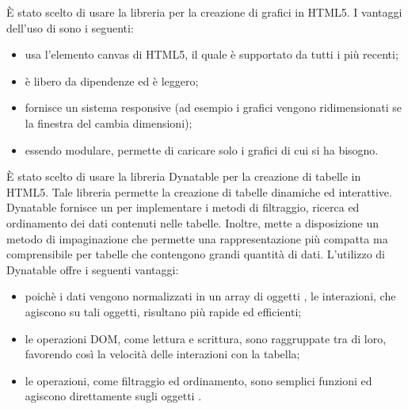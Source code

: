 È stato scelto di usare la libreria   per la creazione di grafici in HTML5.
I vantaggi dell'uso di  sono i seguenti:
\begin{itemize}
\item usa l'elemento canvas di HTML5, il quale è supportato da tutti i  più recenti;
\item è libero da dipendenze ed è leggero;
\item fornisce un sistema responsive (ad esempio i grafici vengono ridimensionati se la finestra del  cambia dimensioni);
\item essendo modulare, permette di caricare solo i grafici di cui si ha bisogno.
\end{itemize}

È stato scelto di usare la libreria  Dynatable per la creazione di tabelle in HTML5. Tale libreria permette la creazione di tabelle dinamiche ed interattive. Dynatable fornisce un  per implementare i metodi di filtraggio, ricerca ed ordinamento dei dati contenuti nelle tabelle. Inoltre, mette a disposizione un metodo di impaginazione che permette una rappresentazione più compatta ma comprensibile per tabelle che contengono grandi quantità di dati.
L'utilizzo di Dynatable offre i seguenti vantaggi:
\begin{itemize}
\item poichè i dati vengono normalizzati in un array di oggetti , le interazioni, che agiscono su tali oggetti, risultano più rapide ed efficienti;
\item le operazioni DOM, come lettura e scrittura, sono raggruppate tra di loro, favorendo così la velocità delle interazioni con la tabella;
\item le operazioni, come filtraggio ed ordinamento, sono semplici funzioni  ed agiscono direttamente sugli oggetti .
\end{itemize}

